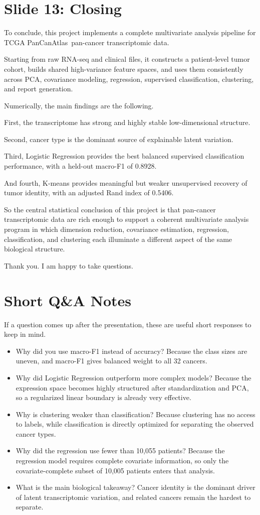 \documentclass[12pt]{article}
\newcommand{\tcga}{TCGA PanCanAtlas}
\begin{document}
\section{Slide 13: Closing}
To conclude, this project implements a complete multivariate analysis pipeline for \tcga\ pan-cancer transcriptomic data.

Starting from raw RNA-seq and clinical files, it constructs a patient-level tumor cohort, builds shared high-variance feature spaces, and uses them consistently across PCA, covariance modeling, regression, supervised classification, clustering, and report generation.

Numerically, the main findings are the following.

First, the transcriptome has strong and highly stable low-dimensional structure.

Second, cancer type is the dominant source of explainable latent variation.

Third, Logistic Regression provides the best balanced supervised classification performance, with a held-out macro-F1 of 0.8928.

And fourth, K-means provides meaningful but weaker unsupervised recovery of tumor identity, with an adjusted Rand index of 0.5406.

So the central statistical conclusion of this project is that pan-cancer transcriptomic data are rich enough to support a coherent multivariate analysis program in which dimension reduction, covariance estimation, regression, classification, and clustering each illuminate a different aspect of the same biological structure.

Thank you. I am happy to take questions.

\section{Short Q\&A Notes}
If a question comes up after the presentation, these are useful short responses to keep in mind.

\begin{itemize}
  \item Why did you use macro-F1 instead of accuracy? Because the class sizes are uneven, and macro-F1 gives balanced weight to all 32 cancers.
  \item Why did Logistic Regression outperform more complex models? Because the expression space becomes highly structured after standardization and PCA, so a regularized linear boundary is already very effective.
  \item Why is clustering weaker than classification? Because clustering has no access to labels, while classification is directly optimized for separating the observed cancer types.
  \item Why did the regression use fewer than 10,055 patients? Because the regression model requires complete covariate information, so only the covariate-complete subset of 10,005 patients enters that analysis.
  \item What is the main biological takeaway? Cancer identity is the dominant driver of latent transcriptomic variation, and related cancers remain the hardest to separate.
\end{itemize}
\end{document}
